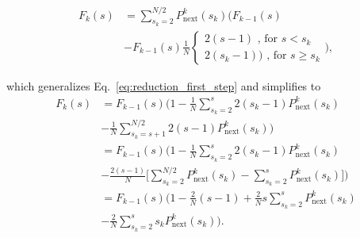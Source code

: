 \documentclass[
reprint,
twocolumn,
amsmath,amssymb,superscriptaddress,aps,
pre]{revtex4-1}
\newcommand{\Pin}{P_{\mathrm{next}}}
\begin{document}
\begin{align}
    F_k(s)&= \sum_{s_k=2}^{N/2} \Pin^k(s_k)\nonumber \bigg(F_{k-1}(s) \\
    & - F_{k-1}(s)\frac{1}{N}
    {\begin{cases}
     2(s-1) \text{ , for } s<s_k\\
     2(s_k -1))\text{ , for } s\geq s_k
    \end{cases}}\bigg),
\end{align}

which generalizes Eq.~\ref{eq:reduction_first_step} and simplifies to
\begin{align}
   F_k(s)&=F_{k-1}(s)\Big(1-\frac{1}{N} \sum_{s_k=2}^{s} 2 (s_k-1) \Pin^k(s_k)\nonumber \\
   &-\frac{1}{N} \sum_{s_k=s+1}^{N/2} 2 (s-1) \Pin^k(s_k)\Big)\nonumber \\
   &=F_{k-1}(s)\bigg(1-\frac{1}{N}
   \sum_{s_k=2}^{s} 2 (s_k-1) \Pin^k(s_k)\nonumber \\
   &-\frac{2 (s-1)}{N} \Big[\sum_{s_k=2}^{N/2} \Pin^k(s_k) - \sum_{s_k=2}^{s} \Pin^k(s_k)\Big]\bigg)\nonumber \\
   &=F_{k-1}(s)\Big(1-\frac{2}{N} (s-1) 
   +\frac{2}{N} s
   \sum_{s_k=2}^{s}\Pin^k(s_k)\nonumber \\
   &-\frac{2}{N}
   \sum_{s_k=2}^{s} s_k \Pin^k(s_k)\Big).
   \label{eq.Fk_rec}
\end{align}
\end{document}
